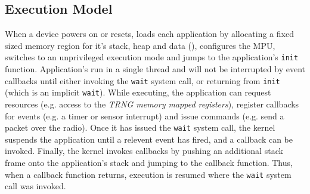 
\subsection{Execution Model}

When a device powers on or resets, \name loads each application by allocating a
fixed sized memory region for it's stack, heap and data
(), configures the MPU, switches to an unprivileged
execution mode and jumps to the application's {\tt init} function. Application's
run in a single thread and will not be interrupted by event callbacks until
either invoking the {\tt wait} system call, or returning from {\tt init} (which is
an implicit {\tt wait}). While executing, the application can request resources
(e.g. access to the \emph{TRNG memory mapped registers}), register callbacks for
events (e.g. a timer or sensor interrupt) and issue commands (e.g. send a packet
over the radio). Once it has issued the {\tt wait} system call, the kernel
suspends the application until a relevent event has fired, and a callback can be
invoked. Finally, the kernel invokes callbacks by pushing an additional stack
frame onto the application's stack and jumping to the callback function. Thus,
when a callback function returns, execution is resumed where the {\tt wait}
system call was invoked.


%

